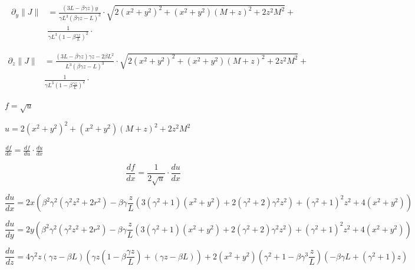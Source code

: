 \begin{equation}
	\begin{aligned}
	\partial_y \| J\| &= \frac{(3L-\beta\gamma z)y}{\gamma L^3(\beta\gamma z - L)^3} \cdot \sqrt{ 2 ( x^2+ y^2 )^2 + (x^2+y^2)(M+z)^2 + 2 z^2 M^2 } +  \\
	& \frac{1}{\gamma L^3 (1-\beta\frac{\gamma z}{L})^2} \cdot
	\end{aligned}
\end{equation}

\begin{equation}
	\begin{aligned}
	\partial_z \| J\| &= \frac{(3L-\beta\gamma z)\gamma z - 2\beta L^2}{ L^3(\beta\gamma z - L)^3} \cdot \sqrt{ 2 ( x^2+ y^2 )^2 + (x^2+y^2)(M+z)^2 + 2 z^2 M^2 } +  \\
	& \frac{1}{\gamma L^3 (1-\beta\frac{\gamma z}{L})^2} \cdot
	\end{aligned}
\end{equation}

$f=\sqrt{u}$

$u=2 ( x^2+ y^2 )^2 + (x^2+y^2)(M+z)^2 + 2 z^2 M^2 $

$\frac{df}{dx}=\frac{df}{du}\cdot \frac{du}{dx}$

\begin{equation}
	\frac{df}{dx} = \frac{1}{2\sqrt{u}} \cdot \frac{du}{dx}
\end{equation}

\begin{equation}
	\frac{du}{dx} = 2x \left( \beta^2 \gamma^2 (\gamma^2z^2 +2r^2) - \beta \gamma \frac{z}{L} \left( 3(\gamma^2+1)(x^2+y^2) + 2(\gamma^2+2)\gamma^2z^2 \right) + (\gamma^2+1)^2z^2 + 4(x^2+y^2) \right)
\end{equation}

\begin{equation}
	\frac{du}{dy} = 2y \left( \beta^2 \gamma^2 (\gamma^2z^2 +2r^2) - \beta \gamma \frac{z}{L} \left( 3(\gamma^2+1)(x^2+y^2) + 2(\gamma^2+2)\gamma^2z^2 \right) + (\gamma^2+1)^2z^2 + 4(x^2+y^2) \right)
\end{equation}

\begin{equation}
	\frac{du}{dz} = 4\gamma^2 z (\gamma z -\beta L) \left( \gamma z(1-\beta\frac{\gamma z}{L}) + (\gamma z -\beta L) \right) +
	2(x^2+y^2)(\gamma^2+1-\beta\gamma^3\frac{z}{L})(-\beta\gamma L + (\gamma^2+1)z )
\end{equation}



